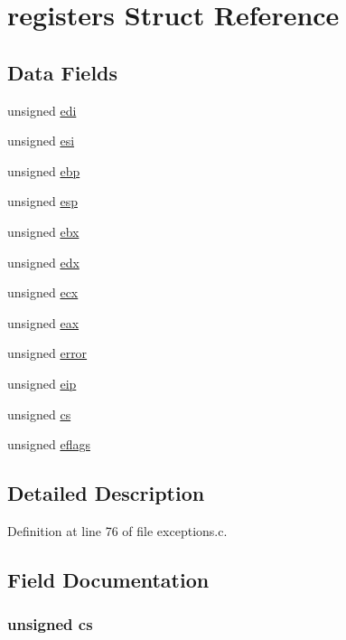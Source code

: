 \hypertarget{structregisters}{
\section{registers Struct Reference}
\label{structregisters}
}
\subsection*{Data Fields}
\begin{DoxyCompactItemize}
\item 
unsigned \hyperlink{structregisters_aa8328d7107121caab9a02f51ec3bf4de}{edi}
\item 
unsigned \hyperlink{structregisters_a20d41899401bd0bfefa0873f3e1a3548}{esi}
\item 
unsigned \hyperlink{structregisters_a0b23dfe5ba8a9bc90315a06784350cb2}{ebp}
\item 
unsigned \hyperlink{structregisters_ae5fca9ad9630a49d43dc822c7c36b795}{esp}
\item 
unsigned \hyperlink{structregisters_acff6a7e560519d3d068076c43be5a986}{ebx}
\item 
unsigned \hyperlink{structregisters_ab1addf7d38e0c8a57015f07bd282130f}{edx}
\item 
unsigned \hyperlink{structregisters_a356bd1510740b64868b03ae84a80010e}{ecx}
\item 
unsigned \hyperlink{structregisters_a6d4f2bc514bdffb925ddb14d37a12d9d}{eax}
\item 
unsigned \hyperlink{structregisters_aa25790aaf38769a83aeb3bf66ba2adc3}{error}
\item 
unsigned \hyperlink{structregisters_a17f7bde379a0e9874a602e53b15d14e3}{eip}
\item 
unsigned \hyperlink{structregisters_a3f7dcd390a33c96d3b184f643038278e}{cs}
\item 
unsigned \hyperlink{structregisters_a76117c5f5403e959cdaa62b640edaa02}{eflags}
\end{DoxyCompactItemize}


\subsection{Detailed Description}


Definition at line 76 of file exceptions.c.



\subsection{Field Documentation}
\hypertarget{structregisters_a3f7dcd390a33c96d3b184f643038278e}{
\subsubsection[{cs}]{\setlength{\rightskip}{0pt plus 5cm}unsigned {\bf cs}}}
\label{structregisters_a3f7dcd390a33c96d3b184f643038278e}


